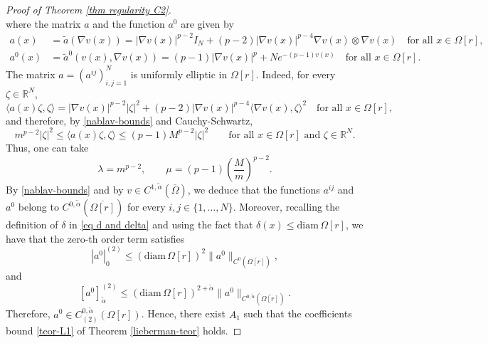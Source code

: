 \documentclass[10pt,a4paper, reqno]{amsart}
\numberwithin{equation}{section}
\newcommand{\R}{\mathbb{R}}
\begin{document}
\begin{proof}[Proof of Theorem \ref{thm regularity C2}]
\begin{equation}
\end{equation}
where the matrix $a$ and the function $a^0$ are given by
\begin{align*}
    a(x)&=\tilde{a}(\nabla v(x)) = |\nabla v(x)|^{p-2} I_N + (p-2) |\nabla v(x)|^{p-4} \nabla v(x) \otimes \nabla v(x) \quad\text{for all }x \in\Omega[r],\\
    a^0(x)&= \tilde{a}^0(v(x),\nabla v(x))= (p-1)|\nabla v(x)|^p + N e^{-(p-1)v(x)} \quad\text{for all }x \in\Omega[r].
\end{align*}
The matrix $a=(a^{ij})_{i,j=1}^N$ is uniformly elliptic in $\Omega[r]$. Indeed, for every $\zeta\in\R^N$,
\[
    \langle a(x) \zeta , \zeta \rangle =|\nabla v(x)|^{p-2}|\zeta|^2+(p-2)|\nabla v(x)|^{p-4}\langle \nabla v(x),\zeta\rangle^2 \quad\text{for all }x \in\Omega[r],
\]
and therefore, by \eqref{nablav-bounds} and Cauchy-Schwartz,
\begin{equation*}
    m^{p-2}|\zeta|^2\le \langle a(x) \zeta , \zeta \rangle \le (p-1)M^{p-2}|\zeta|^2 \qquad \text{for all } x\in \Omega[r] \text{ and } \zeta\in\R^N.
\end{equation*}
Thus, one can take
\[
    \lambda=m^{p-2},\qquad\mu=(p-1)\left(\frac{M}{m}\right)^{p-2}.
\]
By \eqref{nablav-bounds} and by $v\in C^{1,\tilde{\alpha}}(\overline\Omega)$, we deduce that the functions $a^{ij}$ and $a^0$ belong to  $C^{0,\tilde{\alpha}}(\overline{\Omega[r]})$ for every $i,j \in \{1,\dots,N\}$. Moreover, recalling the definition of $\delta$ in \eqref{eq d and delta} and using the fact that $\delta(x) \leq \mathrm{diam}\,\Omega[r]$, we have that the zero-th order term satisfies 
\[
    |a^0|_0^{(2)} \leq (\mathrm{diam}\,\Omega[r])^2 \|a^0\|_{C^0(\overline{\Omega[r]})},
\]
and
\[
    [a^0]_{\tilde{\alpha}}^{(2)}\le (\mathrm{diam}\,\Omega[r])^{2+\tilde{\alpha}} \|a^0\|_{C^{0,\tilde{\alpha}}(\overline{\Omega[r]})}.
\]
Therefore, $a^0 \in C_{(2)}^{0,\tilde{\alpha}}(\Omega[r])$. Hence, there exist $A_1$ such that the coefficients bound \eqref{teor-L1} of Theorem \ref{lieberman-teor} holds.


\end{proof}
\end{document}
